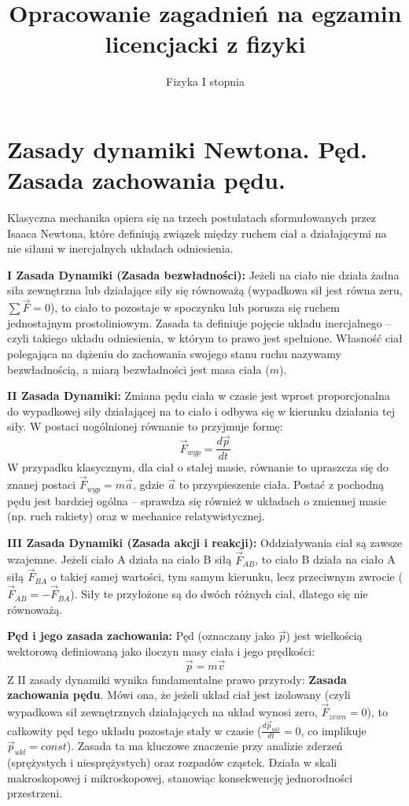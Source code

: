 \documentclass[11pt, a4paper]{article}
\title{\textbf{Opracowanie zagadnień na egzamin licencjacki z fizyki}}
\author{Fizyka I stopnia}
\date{}
\begin{document}
\maketitle
\tableofcontents
\newpage

\section{Zasady dynamiki Newtona. Pęd. Zasada zachowania pędu.}

Klasyczna mechanika opiera się na trzech postulatach sformułowanych przez Isaaca Newtona, które definiują związek między ruchem ciał a działającymi na nie siłami w inercjalnych układach odniesienia.

\textbf{I Zasada Dynamiki (Zasada bezwładności):} Jeżeli na ciało nie działa żadna siła zewnętrzna lub działające siły się równoważą (wypadkowa sił jest równa zeru, $\sum \vec{F} = 0$), to ciało to pozostaje w spoczynku lub porusza się ruchem jednostajnym prostoliniowym. Zasada ta definiuje pojęcie układu inercjalnego – czyli takiego układu odniesienia, w którym to prawo jest spełnione. Własność ciał polegająca na dążeniu do zachowania swojego stanu ruchu nazywamy bezwładnością, a miarą bezwładności jest masa ciała ($m$).

\textbf{II Zasada Dynamiki:} Zmiana pędu ciała w czasie jest wprost proporcjonalna do wypadkowej siły działającej na to ciało i odbywa się w kierunku działania tej siły. W postaci uogólnionej równanie to przyjmuje formę:
\[
\vec{F}_{wyp} = \frac{d\vec{p}}{dt}
\]
W przypadku klasycznym, dla ciał o stałej masie, równanie to upraszcza się do znanej postaci $\vec{F}_{wyp} = m\vec{a}$, gdzie $\vec{a}$ to przyspieszenie ciała. Postać z pochodną pędu jest bardziej ogólna – sprawdza się również w układach o zmiennej masie (np. ruch rakiety) oraz w mechanice relatywistycznej.

\textbf{III Zasada Dynamiki (Zasada akcji i reakcji):} Oddziaływania ciał są zawsze wzajemne. Jeżeli ciało A działa na ciało B siłą $\vec{F}_{AB}$, to ciało B działa na ciało A siłą $\vec{F}_{BA}$ o takiej samej wartości, tym samym kierunku, lecz przeciwnym zwrocie ($\vec{F}_{AB} = -\vec{F}_{BA}$). Siły te przyłożone są do dwóch różnych ciał, dlatego się nie równoważą.

\textbf{Pęd i jego zasada zachowania:}
Pęd (oznaczany jako $\vec{p}$) jest wielkością wektorową definiowaną jako iloczyn masy ciała i jego prędkości:
\[
\vec{p} = m\vec{v}
\]
Z II zasady dynamiki wynika fundamentalne prawo przyrody: \textbf{Zasada zachowania pędu}. Mówi ona, że jeżeli układ ciał jest izolowany (czyli wypadkowa sił zewnętrznych działających na układ wynosi zero, $\vec{F}_{zewn} = 0$), to całkowity pęd tego układu pozostaje stały w czasie ($\frac{d\vec{p}_{ukl}}{dt} = 0$, co implikuje $\vec{p}_{ukl} = const$). Zasada ta ma kluczowe znaczenie przy analizie zderzeń (sprężystych i niesprężystych) oraz rozpadów cząstek. Działa w skali makroskopowej i mikroskopowej, stanowiąc konsekwencję jednorodności przestrzeni.
\end{document}
